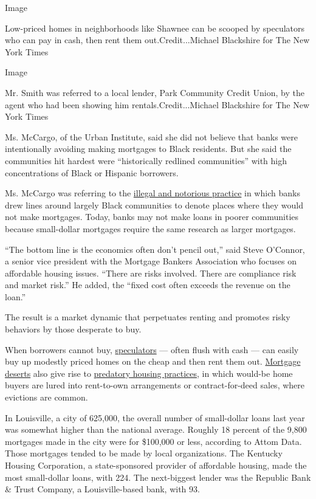 Image

Low-priced homes in neighborhoods like Shawnee can be scooped by
speculators who can pay in cash, then rent them out.Credit...Michael
Blackshire for The New York Times

Image

Mr. Smith was referred to a local lender, Park Community Credit Union,
by the agent who had been showing him rentals.Credit...Michael
Blackshire for The New York Times

Ms. McCargo, of the Urban Institute, said she did not believe that banks
were intentionally avoiding making mortgages to Black residents. But she
said the communities hit hardest were ``historically redlined
communities'' with high concentrations of Black or Hispanic borrowers.

Ms. McCargo was referring to the
\href{https://www.nytimes.com/2017/08/24/upshot/how-redlinings-racist-effects-lasted-for-decades.html}{illegal
and notorious practice} in which banks drew lines around largely Black
communities to denote places where they would not make mortgages. Today,
banks may not make loans in poorer communities because small-dollar
mortgages require the same research as larger mortgages.

``The bottom line is the economics often don't pencil out,'' said Steve
O'Connor, a senior vice president with the Mortgage Bankers Association
who focuses on affordable housing issues. ``There are risks involved.
There are compliance risk and market risk.'' He added, the ``fixed cost
often exceeds the revenue on the loan.''

The result is a market dynamic that perpetuates renting and promotes
risky behaviors by those desperate to buy.

When borrowers cannot buy,
\href{https://www.nytimes.com/2019/03/25/business/fox-news-clayton-morris-indianapolis.html}{speculators}
--- often flush with cash --- can easily buy up modestly priced homes on
the cheap and then rent them out.
\href{https://www.nytimes.com/2017/11/04/business/detroit-housing.html}{Mortgage
deserts} also give rise to
\href{https://www.nytimes.com/series/the-housing-trap}{predatory housing
practices}, in which would-be home buyers are lured into rent-to-own
arrangements or contract-for-deed sales, where evictions are common.

In Louisville, a city of 625,000, the overall number of small-dollar
loans last year was somewhat higher than the national average. Roughly
18 percent of the 9,800 mortgages made in the city were for \$100,000 or
less, according to Attom Data. Those mortgages tended to be made by
local organizations. The Kentucky Housing Corporation, a state-sponsored
provider of affordable housing, made the most small-dollar loans, with
224. The next-biggest lender was the Republic Bank \& Trust Company, a
Louisville-based bank, with 93.

